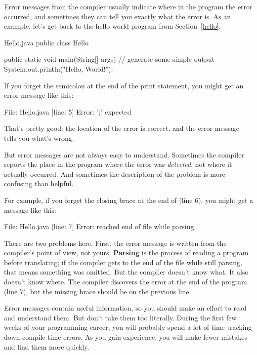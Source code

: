 
Error messages from the compiler usually indicate where in the program the error occurred, and sometimes they can tell you exactly what the error is.
As an example, let's get back to the hello world program from Section~\ref{hello}.

\begin{trinket}[235]{Hello.java}
public class Hello {

    public static void main(String[] args) {
        // generate some simple output
        System.out.println("Hello, World!");
    }
}
\end{trinket}


If you forget the semicolon at the end of the print statement, you might get an error message like this:

\begin{stdout}
File: Hello.java  [line: 5]
Error: ';' expected
\end{stdout}

That's pretty good: the location of the error is correct, and the error message tells you what's wrong.

But error messages are not always easy to understand.
Sometimes the compiler reports the place in the program where the error was {\em detected}, not where it actually occurred.
And sometimes the description of the problem is more confusing than helpful.

For example, if you forget the closing brace at the end of  (line 6), you might get a message like this:

\begin{stdout}
File: Hello.java  [line: 7]
Error: reached end of file while parsing
\end{stdout}


There are two problems here.
First, the error message is written from the compiler's point of view, not yours.
{\bf Parsing} is the process of reading a program before translating; if the compiler gets to the end of the file while still parsing, that means something was omitted.
But the compiler doesn't know what.
It also doesn't know where.
The compiler discovers the error at the end of the program (line 7), but the missing brace should be on the previous line.

Error messages contain useful information, so you should make an effort to read and understand them.
But don't take them too literally.
During the first few weeks of your programming career, you will probably spend a lot of time tracking down compile-time errors.
As you gain experience, you will make fewer mistakes and find them more quickly.

